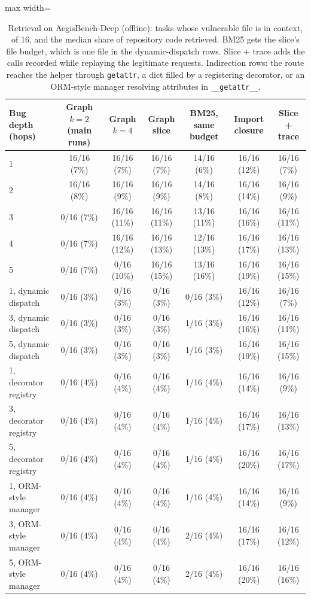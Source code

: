 \documentclass[10pt,a4paper]{article}
\newcommand{\code}[1]{\texttt{#1}}
\begin{document}
\begin{table}[H]
\centering\small
\caption{Retrieval on AegisBench-Deep (offline): tasks whose vulnerable file is in context, of 16, and the median share of repository code retrieved. BM25 gets the slice's file budget, which is one file in the dynamic-dispatch rows. Slice + trace adds the calls recorded while replaying the legitimate requests. Indirection rows: the route reaches the helper through \code{getattr}, a dict filled by a registering decorator, or an ORM-style manager resolving attributes in \code{\_\_getattr\_\_}.}
\label{tab:graph}
\begin{adjustbox}{max width=\linewidth}\begin{tabular}{lcccccc}
\toprule
Bug depth (hops) & Graph $k{=}2$ (main runs) & Graph $k{=}4$ & Graph slice & BM25, same budget & Import closure & Slice + trace\\
\midrule
1 & 16/16 (7\%) & 16/16 (7\%) & 16/16 (7\%) & 14/16 (6\%) & 16/16 (12\%) & 16/16 (7\%)\\
2 & 16/16 (8\%) & 16/16 (9\%) & 16/16 (9\%) & 14/16 (8\%) & 16/16 (14\%) & 16/16 (9\%)\\
3 & 0/16 (7\%) & 16/16 (11\%) & 16/16 (11\%) & 13/16 (11\%) & 16/16 (16\%) & 16/16 (11\%)\\
4 & 0/16 (7\%) & 16/16 (12\%) & 16/16 (13\%) & 12/16 (13\%) & 16/16 (17\%) & 16/16 (13\%)\\
5 & 0/16 (7\%) & 0/16 (10\%) & 16/16 (15\%) & 13/16 (16\%) & 16/16 (19\%) & 16/16 (15\%)\\
1, dynamic dispatch & 0/16 (3\%) & 0/16 (3\%) & 0/16 (3\%) & 0/16 (3\%) & 16/16 (12\%) & 16/16 (7\%)\\
3, dynamic dispatch & 0/16 (3\%) & 0/16 (3\%) & 0/16 (3\%) & 1/16 (3\%) & 16/16 (16\%) & 16/16 (11\%)\\
5, dynamic dispatch & 0/16 (3\%) & 0/16 (3\%) & 0/16 (3\%) & 1/16 (3\%) & 16/16 (19\%) & 16/16 (15\%)\\
1, decorator registry & 0/16 (4\%) & 0/16 (4\%) & 0/16 (4\%) & 1/16 (4\%) & 16/16 (14\%) & 16/16 (9\%)\\
3, decorator registry & 0/16 (4\%) & 0/16 (4\%) & 0/16 (4\%) & 1/16 (4\%) & 16/16 (17\%) & 16/16 (13\%)\\
5, decorator registry & 0/16 (4\%) & 0/16 (4\%) & 0/16 (4\%) & 1/16 (4\%) & 16/16 (20\%) & 16/16 (17\%)\\
1, ORM-style manager & 0/16 (4\%) & 0/16 (4\%) & 0/16 (4\%) & 1/16 (4\%) & 16/16 (14\%) & 16/16 (9\%)\\
3, ORM-style manager & 0/16 (4\%) & 0/16 (4\%) & 0/16 (4\%) & 2/16 (4\%) & 16/16 (17\%) & 16/16 (12\%)\\
5, ORM-style manager & 0/16 (4\%) & 0/16 (4\%) & 0/16 (4\%) & 2/16 (4\%) & 16/16 (20\%) & 16/16 (16\%)\\
\bottomrule
\end{tabular}\end{adjustbox}
\end{table}
\end{document}

